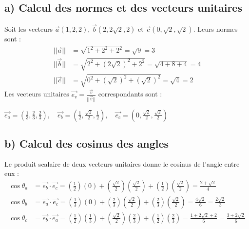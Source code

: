 \documentclass[11pt,a4paper]{article}
\begin{document}
\subsection*{a) Calcul des normes et des vecteurs unitaires}
Soit les vecteurs $\vec{a}(1,2,2)$, $\vec{b}(2, 2\sqrt{2}, 2)$ et $\vec{c}(0, \sqrt{2}, \sqrt{2})$.
Leurs normes sont :
\begin{align*}
||\vec{a}|| &= \sqrt{1^2 + 2^2 + 2^2} = \sqrt{9} = 3 \\
||\vec{b}|| &= \sqrt{2^2 + (2\sqrt{2})^2 + 2^2} = \sqrt{4 + 8 + 4} = 4 \\
||\vec{c}|| &= \sqrt{0^2 + (\sqrt{2})^2 + (\sqrt{2})^2} = \sqrt{4} = 2
\end{align*}
Les vecteurs unitaires $\vec{e_v} = \frac{\vec{v}}{||\vec{v}||}$ correspondants sont :
\begin{sonucbox}
$\vec{e_a} = \left(\frac{1}{3}, \frac{2}{3}, \frac{2}{3}\right), \quad 
\vec{e_b} = \left(\frac{1}{2}, \frac{\sqrt{2}}{2}, \frac{1}{2}\right), \quad 
\vec{e_c} = \left(0, \frac{\sqrt{2}}{2}, \frac{\sqrt{2}}{2}\right)$
\end{sonucbox}

\subsection*{b) Calcul des cosinus des angles}
Le produit scalaire de deux vecteurs unitaires donne le cosinus de l'angle entre eux :
\begin{align*}
\cos\theta_a &= \vec{e_b} \cdot \vec{e_c} = \left(\frac{1}{2}\right)(0) + \left(\frac{\sqrt{2}}{2}\right)\left(\frac{\sqrt{2}}{2}\right) + \left(\frac{1}{2}\right)\left(\frac{\sqrt{2}}{2}\right) = \frac{2+\sqrt{2}}{4} \\
\cos\theta_b &= \vec{e_a} \cdot \vec{e_c} = \left(\frac{1}{3}\right)(0) + \left(\frac{2}{3}\right)\left(\frac{\sqrt{2}}{2}\right) + \left(\frac{2}{3}\right)\left(\frac{\sqrt{2}}{2}\right) = \frac{4\sqrt{2}}{6} = \frac{2\sqrt{2}}{3} \\
\cos\theta_c &= \vec{e_b} \cdot \vec{e_a} = \left(\frac{1}{2}\right)\left(\frac{1}{3}\right) + \left(\frac{\sqrt{2}}{2}\right)\left(\frac{2}{3}\right) + \left(\frac{1}{2}\right)\left(\frac{2}{3}\right) = \frac{1 + 2\sqrt{2} + 2}{6} = \frac{3+2\sqrt{2}}{6}
\end{align*}
\end{document}
